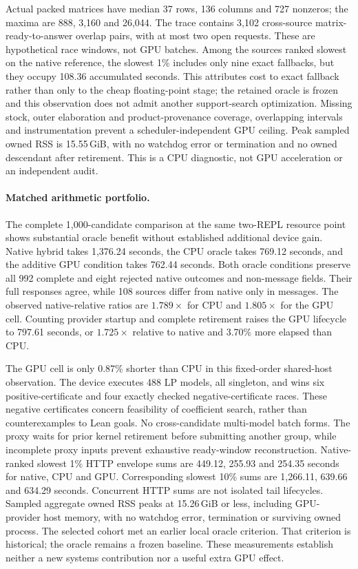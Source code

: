 \documentclass[10pt,twocolumn]{article}
\begin{document}
Actual packed matrices have median 37 rows, 136 columns and 727 nonzeros;
the maxima are 888, 3,160 and 26,044. The trace contains 3,102 cross-source
matrix-ready-to-answer overlap pairs, with at most two open requests.
These are hypothetical race windows, not GPU batches. Among the sources
ranked slowest on the native reference, the slowest 1\% includes only nine
exact fallbacks, but they occupy 108.36 accumulated seconds. This attributes cost to exact fallback rather than only to the cheap
floating-point stage; the retained oracle is frozen and this observation
does not admit another support-search optimization.
Missing stock, outer elaboration and product-provenance coverage, overlapping
intervals and instrumentation prevent a scheduler-independent GPU ceiling.
Peak sampled owned RSS is 15.55\,GiB, with no watchdog error or termination
and no owned descendant after retirement. This is a CPU diagnostic, not
GPU acceleration or an independent audit.

\paragraph{Matched arithmetic portfolio.}
The complete 1,000-candidate comparison at the same two-REPL resource point
shows substantial oracle benefit without established additional device gain.
Native hybrid takes 1,376.24 seconds, the CPU oracle takes 769.12 seconds, and
the additive GPU condition takes 762.44 seconds. Both oracle conditions
preserve all 992 complete and eight rejected native outcomes and non-message
fields. Their full responses agree, while 108 sources differ from native
only in messages. The observed native-relative ratios are $1.789\times$ for
CPU and $1.805\times$ for the GPU cell. Counting provider startup and complete
retirement raises the GPU lifecycle to 797.61 seconds, or $1.725\times$
relative to native and 3.70\% more elapsed than CPU.

The GPU cell is only 0.87\% shorter than CPU in this fixed-order shared-host
observation. The device executes 488 LP models, all singleton, and wins six
positive-certificate and four exactly checked negative-certificate races.
These negative certificates concern feasibility of coefficient search,
rather than counterexamples to Lean goals.
No cross-candidate multi-model batch forms. The proxy waits for prior kernel
retirement before submitting another group, while incomplete proxy inputs
prevent exhaustive ready-window reconstruction. Native-ranked slowest 1\%
HTTP envelope sums are 449.12, 255.93 and 254.35 seconds for native, CPU and
GPU. Corresponding slowest 10\% sums are 1,266.11, 639.66 and 634.29 seconds.
Concurrent HTTP sums are not isolated tail lifecycles. Sampled aggregate
owned RSS peaks at 15.26\,GiB or less, including GPU-provider host memory,
with no watchdog error, termination or surviving owned process. The selected
cohort met an earlier local oracle criterion. That criterion is historical;
the oracle remains a frozen baseline. These measurements establish neither
a new systems contribution nor a useful extra GPU effect.
\end{document}
